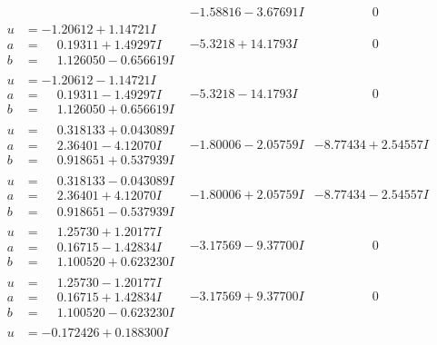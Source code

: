 \documentclass[1p]{elsarticle_modified}
\theoremstyle{definition}
\begin{document}
$$\begin{array}{c|c|c}
 & -1.58816 - 3.67691 I & \phantom{-0.000000 } 0 \\ \hline\begin{aligned}
u &= -1.20612 + 1.14721 I \\
a &= \phantom{-}0.19311 + 1.49297 I \\
b &= \phantom{-}1.126050 - 0.656619 I\end{aligned}
 & -5.3218 + 14.1793 I & \phantom{-0.000000 } 0 \\ \hline\begin{aligned}
u &= -1.20612 - 1.14721 I \\
a &= \phantom{-}0.19311 - 1.49297 I \\
b &= \phantom{-}1.126050 + 0.656619 I\end{aligned}
 & -5.3218 - 14.1793 I & \phantom{-0.000000 } 0 \\ \hline\begin{aligned}
u &= \phantom{-}0.318133 + 0.043089 I \\
a &= \phantom{-}2.36401 - 4.12070 I \\
b &= \phantom{-}0.918651 + 0.537939 I\end{aligned}
 & -1.80006 - 2.05759 I & -8.77434 + 2.54557 I \\ \hline\begin{aligned}
u &= \phantom{-}0.318133 - 0.043089 I \\
a &= \phantom{-}2.36401 + 4.12070 I \\
b &= \phantom{-}0.918651 - 0.537939 I\end{aligned}
 & -1.80006 + 2.05759 I & -8.77434 - 2.54557 I \\ \hline\begin{aligned}
u &= \phantom{-}1.25730 + 1.20177 I \\
a &= \phantom{-}0.16715 - 1.42834 I \\
b &= \phantom{-}1.100520 + 0.623230 I\end{aligned}
 & -3.17569 - 9.37700 I & \phantom{-0.000000 } 0 \\ \hline\begin{aligned}
u &= \phantom{-}1.25730 - 1.20177 I \\
a &= \phantom{-}0.16715 + 1.42834 I \\
b &= \phantom{-}1.100520 - 0.623230 I\end{aligned}
 & -3.17569 + 9.37700 I & \phantom{-0.000000 } 0 \\ \hline\begin{aligned}
u &= -0.172426 + 0.188300 I \\

\end{aligned}
\end{array}$$
\end{document}
